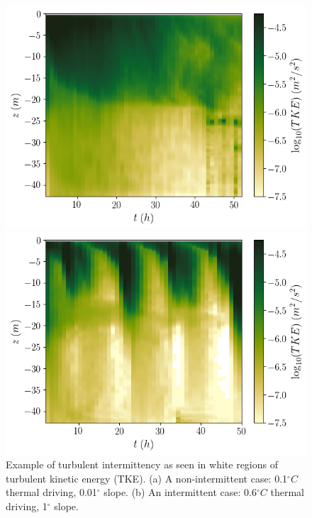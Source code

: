 \documentclass[draft]{agujournal2019}
\begin{document}
\begin{figure}[h!]
    \centering
    \begin{minipage}{0.4\textwidth}
        \includegraphics[trim={0 0cm 3cm 0cm},clip,width=\textwidth]{Figures/dslope2/e_hovmoller.png}
    \end{minipage}%
    \begin{minipage}{0.5\textwidth}
        \includegraphics[trim={0 0cm 0 0cm},clip,width=\textwidth]{Figures/dT4/e_hovmoller.png}
    \end{minipage}
    \caption{Example of turbulent intermittency as seen in white regions of turbulent kinetic energy (TKE). (a) A non-intermittent case: 0.1$^{\circ}C$ thermal driving, 0.01$^{\circ}$ slope. (b) An intermittent case: 0.6$^{\circ}C$ thermal driving, 1$^{\circ}$ slope.}
    \label{fig:intermittency}
\end{figure}
\end{document}
